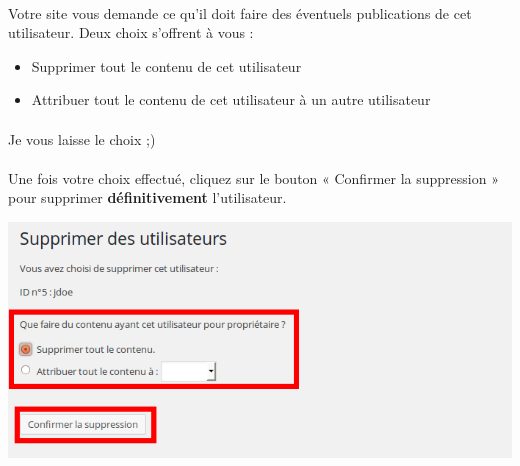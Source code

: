\documentclass[10pt,a4paper]{article}
\begin{document}
\paragraph{}Votre site vous demande ce qu'il doit faire des éventuels publications de cet utilisateur. Deux choix s'offrent à vous :
\begin{itemize}
\item Supprimer tout le contenu de cet utilisateur
\item Attribuer tout le contenu de cet utilisateur à un autre utilisateur
\end{itemize}
\paragraph{}Je vous laisse le choix ;)
\paragraph{}Une fois votre choix effectué, cliquez sur le bouton « Confirmer la suppression » pour supprimer \textbf{définitivement} l'utilisateur.
\begin{center}
\includegraphics[scale=0.3]{img/0162.png}
\end{center}
\newpage
\end{document}
